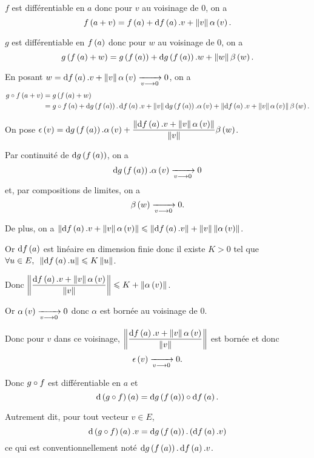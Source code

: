 \begin{dem}
\(f\) est différentiable en \(a\) donc pour \(v\) au voisinage de \(0\), on a \[f\paren{a+v}=f\paren{a}+\odif{f}\paren{a}.v+\norme{v}\alpha\paren{v}.\]

\(g\) est différentiable en \(f\left(a\right)\) donc pour \(w\) au voisinage de \(0\), on a \[g\paren{f\paren{a}+w}=g\paren{f\paren{a}}+\odif{g}\paren{f\paren{a}}.w+\norme{w}\beta\paren{w}.\]

En posant \(w=\odif{f}\paren{a}.v+\norme{v}\alpha\paren{v}\tendqd{v\to0}0\), on a \[\begin{aligned}
g\rond f\paren{a+v}&=g\paren{f\paren{a}+w} \\
&=g\rond f\paren{a}+\odif{g}\paren{f\paren{a}}.\odif{f}\paren{a}.v+\norme{v}\odif{g}\paren{f\paren{a}}.\alpha\paren{v}+\norme{\odif{f}\paren{a}.v+\norme{v}\alpha\paren{v}}\beta\paren{w}.
\end{aligned}\]

On pose \(\epsilon\paren{v}=\odif{g}\paren{f\paren{a}}.\alpha\paren{v}+\dfrac{\norme{\odif{f}\paren{a}.v+\norme{v}\alpha\paren{v}}}{\norme{v}}\beta\paren{w}\).

Par continuité de \(\odif{g}\paren{f\paren{a}}\), on a \[\odif{g}\paren{f\paren{a}}.\alpha\paren{v}\tendqd{v\to0}0\] et, par compositions de limites, on a \[\beta\left(w\right)\xrightarrow[v\longrightarrow0]{}0.\]

De plus, on a \(\norme{\odif{f}\paren{a}.v+\norme{v}\alpha\paren{v}}\leq\norme{\odif{f}\paren{a}.v}+\norme{v}\norme{\alpha\paren{v}}\).

Or \(\odif{f}\paren{a}\) est linéaire en dimension finie donc il existe \(K>0\) tel que \(\quantifs{\forall u\in E}\norme{\odif{f}\paren{a}.u}\leq K\norme{u}\).

Donc \(\norme{\dfrac{\odif{f}\paren{a}.v+\norme{v}\alpha\paren{v}}{\norme{v}}}\leq K+\norme{\alpha\paren{v}}\).

Or \(\alpha\left(v\right)\xrightarrow[v\longrightarrow0]{}0\) donc \(\alpha\) est bornée au voisinage de \(0\).

Donc pour \(v\) dans ce voisinage, \(\norme{\dfrac{\odif{f}\paren{a}.v+\norme{v}\alpha\paren{v}}{\norme{v}}}\) est bornée et donc \[\epsilon\left(v\right)\xrightarrow[v\longrightarrow0]{}0.\]

Donc \(g\circ f\) est différentiable en \(a\) et \[\odif{\paren{g\rond f}}\paren{a}=\odif{g}\paren{f\paren{a}}\rond\odif{f}\paren{a}.\]
\end{dem}

Autrement dit, pour tout vecteur \(v\in E\), \[\odif{\paren{g\rond f}}\paren{a}.v=\odif{g}\paren{f\paren{a}}.\paren{\odif{f}\paren{a}.v}\] ce qui est conventionnellement noté \(\odif{g}\paren{f\paren{a}}.\odif{f}\paren{a}.v\).

